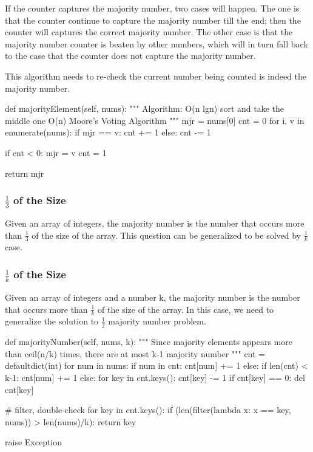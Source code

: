 If the counter captures the majority number, two cases will happen. The one is that the counter continue to capture the majority number till the end; then the counter will captures the correct majority number. The other case is that the majority number counter is beaten by other numbers, which will in turn fall back to the case that the counter does not capture the majority number.
 
This algorithm needs to re-check the current number being counted is indeed the majority number.    

\begin{python}
def majorityElement(self, nums):
    """
    Algorithm:
    O(n lgn) sort and take the middle one
    O(n) Moore's Voting Algorithm
    """
    mjr = nums[0]
    cnt = 0
    for i, v in enumerate(nums):
        if mjr == v:
            cnt += 1
        else:
            cnt -= 1

        if cnt < 0:
            mjr = v
            cnt = 1

    return mjr

\end{python}
\subsubsection{$\frac{1}{3}$ of the Size}
Given an array of integers, the majority number is the number that occurs more than $\frac{1}{3}$ of the size of the array. This question can be generalized to be solved by $\frac{1}{k}$ case. 

\subsubsection{$\frac{1}{k}$ of the Size}
Given an array of integers and a number k, the majority number is the number that occurs more than $\frac{1}{k}$ of the size of the array. In this case, we need to generalize the solution to $\frac{1}{2}$ majority number problem.
\newpag
\begin{python}

def majorityNumber(self, nums, k):
    """
    Since majority elements appears more 
    than ceil(n/k) times, there are at 
    most k-1 majority number
    """
    cnt = defaultdict(int)
    for num in nums:
        if num in cnt:
            cnt[num] += 1
        else:
            if len(cnt) < k-1:
                cnt[num] += 1
            else:
                for key in cnt.keys():
                    cnt[key] -= 1
                    if cnt[key] == 0: del cnt[key]
    
    
    # filter, double-check
    for key in cnt.keys():
        if (len(filter(lambda x: x == key, nums)) 
            > len(nums)/k):
            return key

    raise Exception
\end{python}


